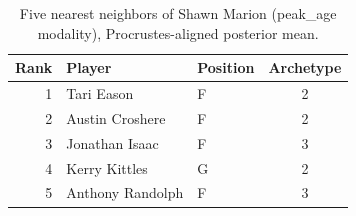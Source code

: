 \begin{table}[htbp]
  \centering\small
  \begin{tabular}{rllc}
    \toprule
    Rank & Player & Position & Archetype \\
    \midrule
    1 & Tari Eason & F & 2 \\
    2 & Austin Croshere & F & 2 \\
    3 & Jonathan Isaac & F & 3 \\
    4 & Kerry Kittles & G & 2 \\
    5 & Anthony Randolph & F & 3 \\
    \bottomrule
  \end{tabular}
  \caption{Five nearest neighbors of Shawn Marion (peak_age modality), Procrustes-aligned posterior mean.}
  \label{tab:Shawn_Marion_neighbors_peak_age}
\end{table}

